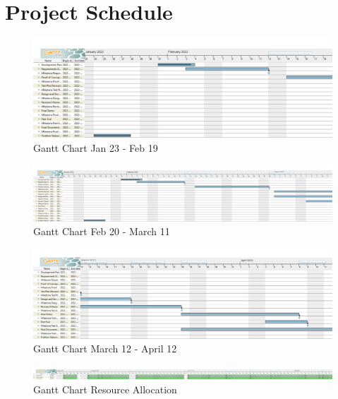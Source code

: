 \documentclass{article}
\begin{document}
\section{Project Schedule}

\begin{figure}[htp]
    \centering
    \includegraphics[width=\textwidth]{Gantt_Charts/3XA3_Gantt_1.png}
    \caption{Gantt Chart Jan 23 - Feb 19}
    \label{fig:gantt0}
\end{figure}

\begin{figure}[htp]
    \centering
    \includegraphics[width=\textwidth]{Gantt_Charts/3XA3_Gantt_2.png}
    \caption{Gantt Chart Feb 20 - March 11}
    \label{fig:gantt1}
\end{figure}

\begin{figure}[htp]
    \centering
    \includegraphics[width=\textwidth]{Gantt_Charts/3XA3_Gantt_3.png}
    \caption{Gantt Chart March 12 - April 12}
    \label{fig:gantt2}
\end{figure}

\begin{figure}[htp]
    \centering
    \includegraphics[width=\textwidth]{Gantt_Charts/3XA3_Gantt_Resources}
    \caption{Gantt Chart Resource Allocation} 
    \label{fig:gantt_resource}
\end{figure}
\end{document}
